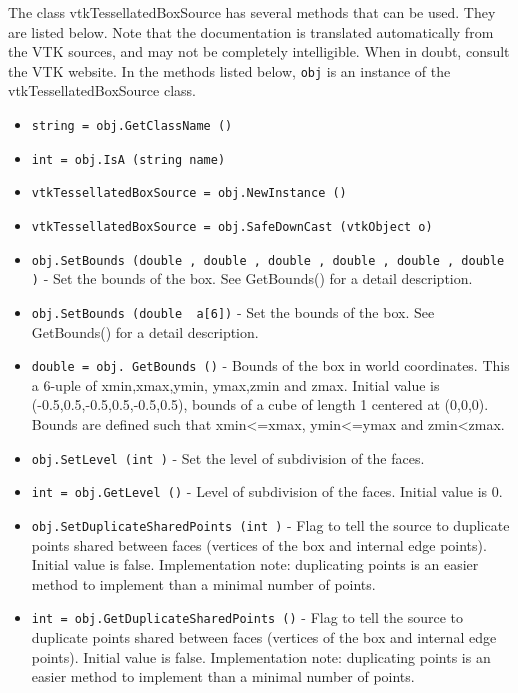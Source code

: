 The class vtkTessellatedBoxSource has several methods that can be used.
  They are listed below.
Note that the documentation is translated automatically from the VTK sources,
and may not be completely intelligible.  When in doubt, consult the VTK website.
In the methods listed below, \verb|obj| is an instance of the vtkTessellatedBoxSource class.
\begin{itemize}
\item  \verb|string = obj.GetClassName ()|

\item  \verb|int = obj.IsA (string name)|

\item  \verb|vtkTessellatedBoxSource = obj.NewInstance ()|

\item  \verb|vtkTessellatedBoxSource = obj.SafeDownCast (vtkObject o)|

\item  \verb|obj.SetBounds (double , double , double , double , double , double )| -  Set the bounds of the box. See GetBounds() for a detail description.
 

\item  \verb|obj.SetBounds (double  a[6])| -  Set the bounds of the box. See GetBounds() for a detail description.
 

\item  \verb|double = obj. GetBounds ()| -  Bounds of the box in world coordinates. This a 6-uple of xmin,xmax,ymin,
 ymax,zmin and zmax. Initial value is (-0.5,0.5,-0.5,0.5,-0.5,0.5), bounds
 of a cube of length 1 centered at (0,0,0). Bounds are defined such that
 xmin<=xmax, ymin<=ymax and zmin<zmax.
 

\item  \verb|obj.SetLevel (int )| -  Set the level of subdivision of the faces.
 

\item  \verb|int = obj.GetLevel ()| -  Level of subdivision of the faces. Initial value is 0.
 

\item  \verb|obj.SetDuplicateSharedPoints (int )| -  Flag to tell the source to duplicate points shared between faces
 (vertices of the box and internal edge points). Initial value is false.
 Implementation note: duplicating points is an easier method to implement
 than a minimal number of points.

\item  \verb|int = obj.GetDuplicateSharedPoints ()| -  Flag to tell the source to duplicate points shared between faces
 (vertices of the box and internal edge points). Initial value is false.
 Implementation note: duplicating points is an easier method to implement
 than a minimal number of points.


\end{itemize}
